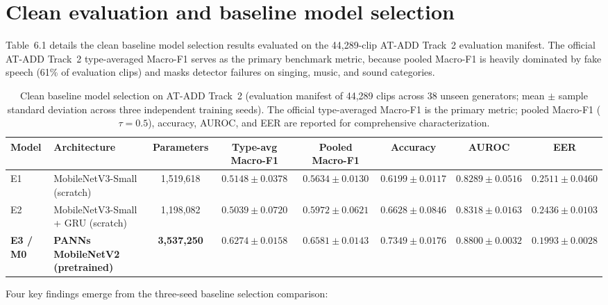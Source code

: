 \documentclass[12pt,a4paper]{report}
\begin{document}
\section{Clean evaluation and baseline model selection}
\label{sec:clean-eval}

Table~6.1 details the clean baseline model selection results evaluated on the 44{,}289-clip AT-ADD Track~2 evaluation manifest. The official AT-ADD Track~2 type-averaged Macro-F1 serves as the primary benchmark metric, because pooled Macro-F1 is heavily dominated by fake speech (61\% of evaluation clips) and masks detector failures on singing, music, and sound categories.

\begin{table}[htbp]
\centering
\caption{Clean baseline model selection on AT-ADD Track~2 (evaluation manifest of 44{,}289 clips across 38 unseen generators; mean $\pm$ sample standard deviation across three independent training seeds). The official type-averaged Macro-F1 is the primary metric; pooled Macro-F1 ($\tau=0.5$), accuracy, AUROC, and EER are reported for comprehensive characterization.}
\label{tab:overall}
\small
\setlength{\tabcolsep}{3.5pt}

\begin{tabular}{@{}llcccccc@{}}
\toprule
Model & Architecture & Parameters & Type-avg Macro-F1 & Pooled Macro-F1 & Accuracy & AUROC & EER \\
\midrule
E1 & MobileNetV3-Small (scratch) & 1{,}519{,}618 & $0.5148 \pm 0.0378$ & $0.5634 \pm 0.0130$ & $0.6199 \pm 0.0117$ & $0.8289 \pm 0.0516$ & $0.2511 \pm 0.0460$ \\
E2 & MobileNetV3-Small + GRU (scratch) & 1{,}198{,}082 & $0.5039 \pm 0.0720$ & $0.5972 \pm 0.0621$ & $0.6628 \pm 0.0846$ & $0.8318 \pm 0.0163$ & $0.2436 \pm 0.0103$ \\
\textbf{E3 / M0} & \textbf{PANNs MobileNetV2 (pretrained)} & \textbf{3{,}537{,}250} & $\mathbf{0.6274 \pm 0.0158}$ & $\mathbf{0.6581 \pm 0.0143}$ & $\mathbf{0.7349 \pm 0.0176}$ & $\mathbf{0.8800 \pm 0.0032}$ & $\mathbf{0.1993 \pm 0.0028}$ \\
\bottomrule
\end{tabular}

\end{table}

Four key findings emerge from the three-seed baseline selection comparison:
\end{document}

